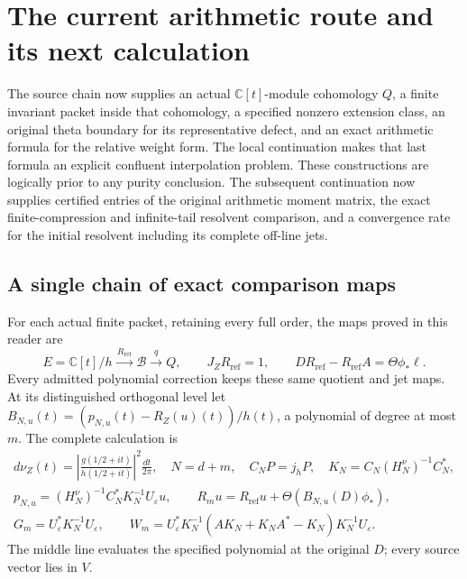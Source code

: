 \section{The current arithmetic route and its next calculation}
\label{sec:research-state}
The source chain now supplies an actual \(\mathbb C[t]\)-module
cohomology \(Q\), a finite invariant packet inside that cohomology,
a specified nonzero extension class, an original theta boundary
for its representative defect, and an exact arithmetic formula
for the relative weight form. The local continuation makes that
last formula an explicit confluent interpolation problem.
These constructions are logically prior to any purity conclusion.
The subsequent continuation now supplies certified entries of the
original arithmetic moment matrix, the exact finite-compression
and infinite-tail resolvent comparison, and a convergence rate for
the initial resolvent including its complete off-line jets.

\subsection{A single chain of exact comparison maps}
For each actual finite packet, retaining every full order, the
maps proved in this reader are
\[
 E=\mathbb C[t]/h
 \xrightarrow{\,R_{\mathrm{ref}}\,}\mathscr B
 \xrightarrow{\,q\,}Q,\qquad
 J_ZR_{\mathrm{ref}}=1,\qquad
 DR_{\mathrm{ref}}-R_{\mathrm{ref}}A
       =\Theta\phi_*\ell .
\]
Every admitted polynomial correction keeps these same quotient
and jet maps. At its distinguished orthogonal level let \(B_{N,u}(t)=(p_{N,u}(t)-R_Z(u)(t))/h(t)\), a polynomial of degree at most \(m\). The complete calculation is
\[
\begin{gathered}
 d\nu_Z(t)=\left|\frac{g(1/2+it)}{h(1/2+it)}\right|^2
       \frac{dt}{2\pi},\quad N=d+m,\quad
 C_NP=j_hP,\quad
 K_N=C_N(H_N^\nu)^{-1}C_N^*,\\
 p_{N,u}=(H_N^\nu)^{-1}C_N^*K_N^{-1}U_\varepsilon u,\qquad
 R_mu=R_{\mathrm{ref}}u+
       \Theta(B_{N,u}(D)\phi_*),\\
 G_m=U_\varepsilon^*K_N^{-1}U_\varepsilon,\qquad
 W_m=U_\varepsilon^*K_N^{-1}
     (AK_N+K_NA^*-K_N)K_N^{-1}U_\varepsilon .
\end{gathered}
\tag{R1}
\]
The middle line evaluates the specified polynomial at the original \(D\); every source vector lies in \(V\).

